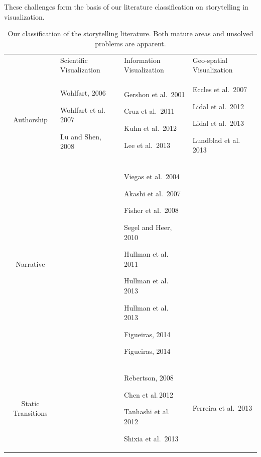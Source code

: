\documentclass{egpubl}
\begin{document}
These challenges form the basis of our literature classification on storytelling in visualization. 

\begin{table}[htbp]
\centering
\caption{Our classification of the storytelling literature. Both mature areas and unsolved problems are apparent.} 
\centering 
\begin{tabular}{c|| p{4cm}| p{5cm}|p{4cm}} 
 & Scientific Visualization & Information Visualization & Geo-spatial Visualization\\ 
 \hhline{====}
Authorship & Wohlfart, 2006 \cite{wohlfat}\par Wohlfart et al.\, 2007\cite{wohlfart2} \par Lu and Shen, 2008\cite{lu2008interactive} \par & Gershon et al.\, 2001\cite{Gershon2}\par Cruz et al.\, 2011 \cite{cruz2011} \par Kuhn et al.\, 2012\cite{kuhn2012} \par  Lee et al.\, 2013\cite{lee2013} \par & Eccles et al.\, 2007\cite{eccles2007} \par  Lidal et al.\, 2012 \cite{lidal}  \par Lidal et al.\, 2013\cite{Lidal2013} \par Lundblad et al.\, 2013\cite{lundblad2013} \par\\
\hline 
Narrative & & Viegas et al.\, 2004\cite{viegas2004}\par Akashi et al.\, 2007\cite{akaishi2007narrative} \par Fisher et al.\, 2008\cite{fisher} \par Segel and Heer, 2010\cite{segal}\par  Hullman et al.\, 2011\cite{hullman} \par Hullman et al.\, 2013 \cite{hullman2013} \par Hullman et al.\, 2013 \cite{hullman2013deeper} \par Figueiras, 2014 \cite{figueiras} \par Figueiras, 2014 \cite{figueiras2014tell}&\\ 
\hline
Static Transitions & & Rebertson, 2008\cite{Rebortson} \par  Chen et al.\,2012\cite{chen2012visual} \par Tanhashi et al.\, 2012\cite{Tanahashi} \par Shixia et al.\, 2013\cite{shixia} & Ferreira et al.\, 2013\cite{ferreira2013} \par \\ 

\end{tabular}
\end{table}
\end{document}
